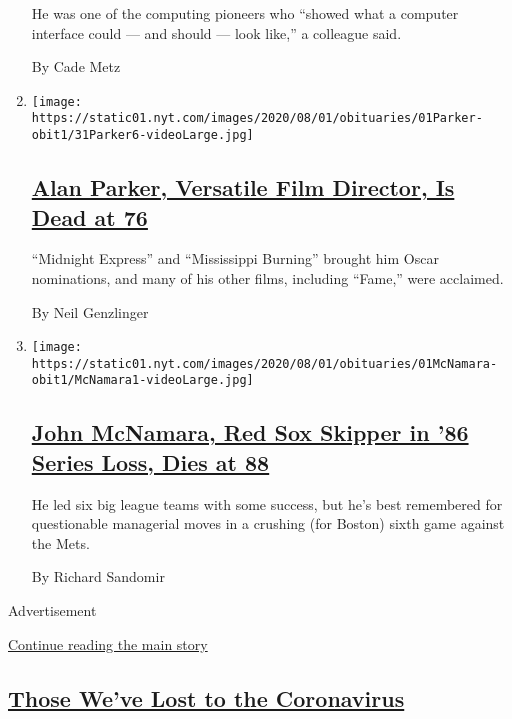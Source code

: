 \begin{enumerate}
  He was one of the computing pioneers who ``showed what a computer
  interface could --- and should --- look like,'' a colleague said.

  By Cade Metz
\item
  \texttt{[image: https://static01.nyt.com/images/2020/08/01/obituaries/01Parker-obit1/31Parker6-videoLarge.jpg]}

  \hypertarget{alan-parker-versatile-film-director-is-dead-at-76}{%
  \subsection{\texorpdfstring{\href{/2020/07/31/movies/alan-parker-versatile-film-director-is-dead-at-76.html}{Alan
  Parker, Versatile Film Director, Is Dead at
  76}}{Alan Parker, Versatile Film Director, Is Dead at 76}}\label{alan-parker-versatile-film-director-is-dead-at-76}}

  ``Midnight Express'' and ``Mississippi Burning'' brought him Oscar
  nominations, and many of his other films, including ``Fame,'' were
  acclaimed.

  By Neil Genzlinger
\item
  \texttt{[image: https://static01.nyt.com/images/2020/08/01/obituaries/01McNamara-obit1/McNamara1-videoLarge.jpg]}

  \hypertarget{john-mcnamara-red-sox-skipper-in-86-series-loss-dies-at-88}{%
  \subsection{\texorpdfstring{\href{/2020/07/31/sports/baseball/john-mcnamara-dead.html}{John
  McNamara, Red Sox Skipper in '86 Series Loss, Dies at
  88}}{John McNamara, Red Sox Skipper in '86 Series Loss, Dies at 88}}\label{john-mcnamara-red-sox-skipper-in-86-series-loss-dies-at-88}}

  He led six big league teams with some success, but he's best
  remembered for questionable managerial moves in a crushing (for
  Boston) sixth game against the Mets.

  By Richard Sandomir
\end{enumerate}

Advertisement

\protect\hyperlink{after-mid1}{Continue reading the main story}

\hypertarget{those-weve-lost-to-the-coronavirus}{%
\subsection{\texorpdfstring{\href{/series/people-died-coronavirus-obituaries}{Those
We've Lost to the
Coronavirus}}{Those We've Lost to the Coronavirus}}\label{those-weve-lost-to-the-coronavirus}}

